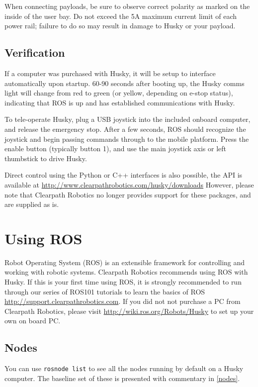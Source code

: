 \documentclass[]{clearpath-latex/clearpath-manual}
\begin{document}
When connecting payloads, be sure to observe correct polarity as marked on the inside of the user bay. 
Do not exceed the 5A maximum current limit of each power rail; failure to do so may result in damage 
to Husky or your payload.

\subsection{Verification}
If a computer was purchased with Husky, it will be setup to interface automatically upon startup. 
60-90 seconds after booting up, the Husky comms light will change from red to green 
(or yellow, depending on e-stop status), indicating that ROS is up and has established communications with Husky.

To tele-operate Husky, plug a USB joystick into the included onboard computer, and release the emergency stop. 
After a few seconds, ROS should recognize the joystick and begin passing commands through to the mobile platform. 
Press the enable button (typically button 1), and use the main joystick axis or left thumbstick to drive Husky.

Direct control using the Python or C++ interfaces is also possible, the API is available at
\url{http://www.clearpathrobotics.com/husky/downloads} However, please note that Clearpath Robotics no 
longer provides support for these packages, and are supplied as is.

\section{Using ROS}
Robot Operating System (ROS) is an extensible framework for controlling and working with robotic systems. 
Clearpath Robotics recommends using ROS with Husky. If this is your first time using ROS, it is strongly 
recommended to run through our series of ROS101 tutorials to learn the basics of ROS 
\url{http://support.clearpathrobotics.com}. If you did not not purchase a PC from Clearpath Robotics, please visit \url{http://wiki.ros.org/Robots/Husky} 
to set up your own on board PC.

\subsection{Nodes}
You can use \lstinline{rosnode list} to see all the nodes running by default on a Husky computer. 
The baseline set of these is presented with commentary in \autoref{nodes}.
\end{document}
